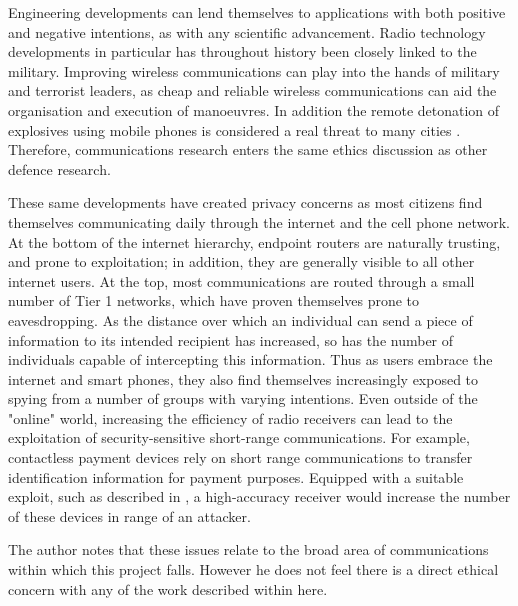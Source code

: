 Engineering developments can lend themselves to applications with both
positive and negative intentions, as with any scientific advancement.
Radio technology developments in particular has throughout history been
closely linked to the military.
Improving wireless communications can play into the hands of military
and terrorist leaders, as cheap and reliable wireless communications can
aid the organisation and execution of manoeuvres. In addition the remote
detonation of explosives using mobile phones is considered a real threat
to many cities \cite{[10]}. Therefore, communications research enters the same ethics discussion as other defence research.

These same developments have created privacy concerns as most citizens find themselves communicating daily through the internet and the cell phone network. At the bottom of the internet hierarchy, endpoint routers are naturally trusting, and prone to exploitation; in addition, they are generally visible to all other internet users. At the top, most communications are routed through a small number of Tier 1 networks, which have proven themselves prone to eavesdropping. As the distance over which an individual can send a piece of information to its intended recipient has increased, so has the number of individuals capable of intercepting this information. Thus as users embrace the internet and smart phones, they also find themselves increasingly exposed to spying from a number of groups with varying intentions. Even outside of the "online" world, increasing the efficiency of radio receivers can lead to the exploitation of security-sensitive short-range communications. For example, contactless payment devices rely on short range communications to transfer identification information for payment purposes. Equipped with a suitable exploit, such as described in \cite{[9]}, a high-accuracy receiver would increase the number of these devices in range of an attacker.

The author notes that these issues relate to the broad area of communications within which this project falls. However he does not feel there is a direct ethical concern with any of the work described within here.
